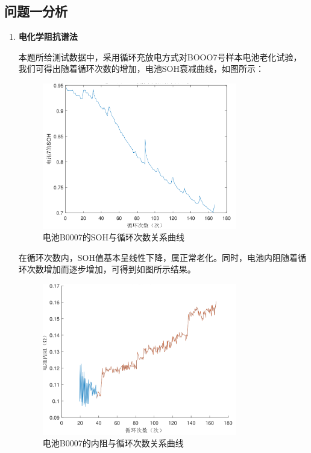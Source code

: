 \documentclass{cumcm}
\begin{document}
\subsection{问题一分析}
\begin{enumerate}[(1)]
\item \textbf{电化学阻抗谱法}\par
本题所给测试数据中，采用循环充放电方式对BOOO7号样本电池老化试验，我们可得出随着循环次数的增加，电池SOH衰减曲线，如图所示：
\begin{figure}[H]
\centering
\includegraphics[width=0.8\textwidth]{img/7-SOH-cycle.png}
\caption{电池B0007的SOH与循环次数关系曲线}\label{figure-a}
\end{figure}
在循环次数内，SOH值基本呈线性下降，属正常老化。同时，电池内阻随着循环次数增加而逐步增加，可得到如图所示结果。
\begin{figure}[H]
\centering
\includegraphics[width=0.8\textwidth]{img/R-cycle.png}
\caption{电池B0007的内阻与循环次数关系曲线}\label{figure-b}
\end{figure}


\end{enumerate}
\end{document}
